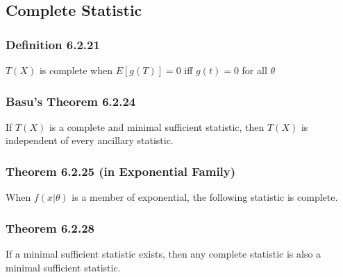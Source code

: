 	\subsection{Complete Statistic}
		\subsubsection*{Definition 6.2.21}
			\(T(X)\) is complete when 
			\(E[g(T)]=0\) iff \(g(t) = 0\)
			for all \(\theta\) 
		
		\subsubsection*{Basu's Theorem 6.2.24}
			If \(T(X)\) is a complete and minimal sufficient statistic, 
			then \(T(X)\) is independent of every ancillary statistic.
		
		\subsubsection*{Theorem 6.2.25 (in Exponential Family)}
			When \(f(x|\theta)\) is a member of exponential, the following statistic is complete.
			
				
		\subsubsection*{Theorem 6.2.28}
			If a minimal sufficient statistic exists, then any complete statistic
			is also a minimal sufficient statistic.
	


